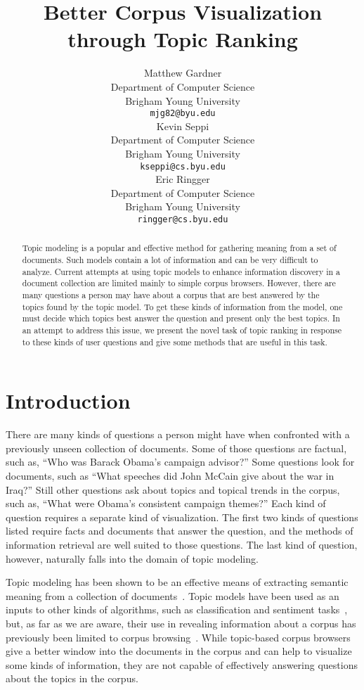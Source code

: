 \documentclass{article}
\title{Better Corpus Visualization through Topic Ranking}
\author{
Matthew Gardner \\
Department of Computer Science \\
Brigham Young University \\
\texttt{mjg82@byu.edu} \\
\And
Kevin Seppi \\
Department of Computer Science \\
Brigham Young University \\
\texttt{kseppi@cs.byu.edu} \\
\And
Eric Ringger \\
Department of Computer Science \\
Brigham Young University \\
\texttt{ringger@cs.byu.edu} \\
}
\begin{document}
\nipsfinalcopy %
\maketitle

\begin{abstract}

Topic modeling is a popular and effective method for gathering meaning from a
set of documents.  Such models contain a lot of information and can be very
difficult to analyze.  Current attempts at using topic models to enhance
information discovery in a document collection are limited mainly to simple
corpus browsers.  However, there are many questions a person may have about a
corpus that are best answered by the topics found by the topic model.  To get
these kinds of information from the model, one must decide which topics best
answer the question and present only the best topics.  In an attempt to address
this issue, we present the novel task of topic ranking in response to these
kinds of user questions and give some methods that are useful in this task.

\end{abstract}

\section{Introduction}
\label{sec:introduction}

There are many kinds of questions a person might have when confronted with a
previously unseen collection of documents.  Some of those questions are
factual, such as, ``Who was Barack Obama's campaign advisor?''  Some questions
look for documents, such as ``What speeches did John McCain give about the war
in Iraq?''  Still other questions ask about topics and topical trends in the
corpus, such as, ``What were Obama's consistent campaign themes?''  Each kind
of question requires a separate kind of visualization.  The first two kinds of
questions listed require facts and documents that answer the question, and the
methods of information retrieval are well suited to those questions.  The last
kind of question, however, naturally falls into the domain of topic modeling.


Topic modeling has been shown to be an effective means of extracting semantic
meaning from a collection of
documents~\cite{griffiths-2004-finding-scientific-topics}.  Topic models have
been used as an inputs to other kinds of algorithms, such as classification and
sentiment tasks~\cite{blei-2003-latent-dirichlet-allocation,
brody-2010-aspect-sentiment-model-for-reviews}, but, as far as we are aware,
their use in revealing information about a corpus has previously been limited
to corpus browsing~\cite{newman-2010-visualizing-with-topic-maps,
blei-arxiv-corpus-browser}.  While topic-based corpus browsers give a better
window into the documents in the corpus and can help to visualize some kinds of
information, they are not capable of effectively answering questions about the
topics in the corpus.
\end{document}
